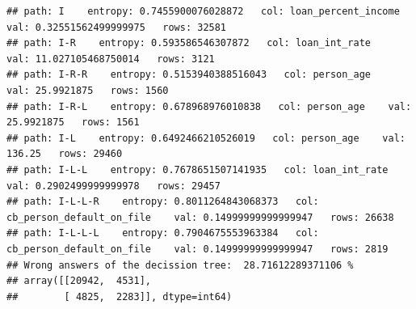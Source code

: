 \documentclass[
]{book}
\begin{document}
\begin{verbatim}
## path: I    entropy: 0.7455900076028872   col: loan_percent_income    val: 0.32551562499999975   rows: 32581
## path: I-R    entropy: 0.593586546307872   col: loan_int_rate    val: 11.027105468750014   rows: 3121
## path: I-R-R    entropy: 0.5153940388516043   col: person_age    val: 25.9921875   rows: 1560
## path: I-R-L    entropy: 0.678968976010838   col: person_age    val: 25.9921875   rows: 1561
## path: I-L    entropy: 0.6492466210526019   col: person_age    val: 136.25   rows: 29460
## path: I-L-L    entropy: 0.7678651507141935   col: loan_int_rate    val: 0.2902499999999978   rows: 29457
## path: I-L-L-R    entropy: 0.8011264843068373   col: cb_person_default_on_file    val: 0.14999999999999947   rows: 26638
## path: I-L-L-L    entropy: 0.7904675553963384   col: cb_person_default_on_file    val: 0.14999999999999947   rows: 2819
## Wrong answers of the decission tree:  28.71612289371106 %
## array([[20942,  4531],
##        [ 4825,  2283]], dtype=int64)
\end{verbatim}

  
\end{document}
